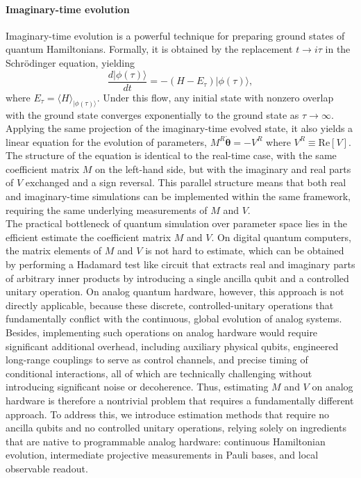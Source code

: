 \documentclass[twocolumn,
pra,aps,superscriptaddress,showpacs,amsmath,amssymb]{revtex4-2}
\begin{document}
\paragraph{Imaginary-time evolution}
Imaginary-time evolution is a powerful technique for preparing ground states of quantum Hamiltonians. Formally, it is obtained by the replacement $t \to i\tau$ in the Schrödinger equation, yielding
\begin{equation}
\frac{d|\phi(\tau)\rangle}{dt} = -(H-E_\tau) |\phi(\tau)\rangle,
\end{equation}
where $E_\tau=\langle H\rangle_{|\phi(\tau)\rangle}$. Under this flow, any initial state with nonzero overlap with the ground state converges exponentially to the ground state as $\tau \to \infty$.
Applying the same projection of the imaginary-time evolved state, it also yields a linear equation for the evolution of parameters, $M^R \dot{\bm{\theta}} = -V^R$ where $V^R \equiv \mathrm{Re}[V]$. The structure of the equation is identical to the real-time case, with the same coefficient matrix $M$ on the left-hand side, but with the imaginary and real parts of $V$ exchanged and a sign reversal. This parallel structure means that both real and imaginary-time simulations can be implemented within the same framework, requiring the same underlying measurements of $M$ and $V$.\\

The practical bottleneck of quantum simulation over parameter space lies in the efficient estimate the coefficient matrix $M$ and $V$. On digital quantum computers, the matrix elements of $M$ and $V$ is not hard to estimate, which can be obtained by performing a Hadamard test like circuit that extracts real and imaginary parts of arbitrary inner products by introducing a single ancilla qubit and a controlled unitary operation. On analog quantum hardware, however, this approach is not directly applicable, because these discrete, controlled-unitary operations that fundamentally conflict with the continuous, global evolution of analog systems. Besides, implementing such operations on analog hardware would require significant additional overhead, including auxiliary physical qubits, engineered long-range couplings to serve as control channels, and precise timing of conditional interactions, all of which are technically challenging without introducing significant noise or decoherence. Thus, estimating $M$ and $V$ on analog hardware is therefore a nontrivial problem that requires a fundamentally different approach. To address this, we introduce estimation methods that require no ancilla qubits and no controlled unitary operations, relying solely on ingredients that are native to programmable analog hardware: continuous Hamiltonian evolution, intermediate projective measurements in Pauli bases, and local observable readout.
\end{document}
